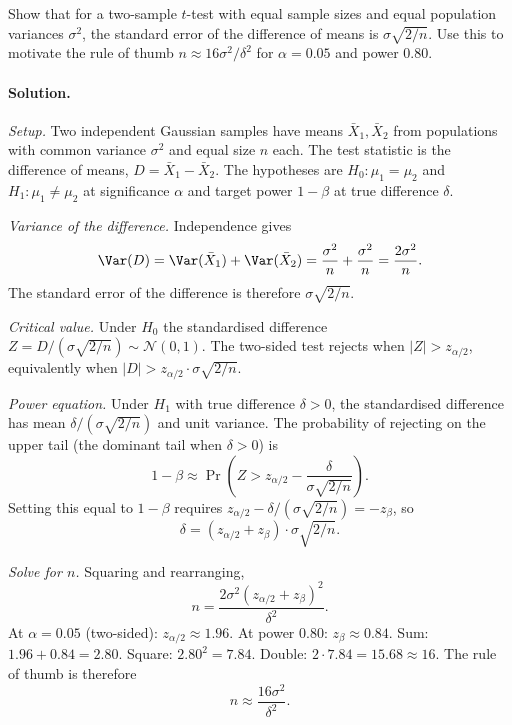 \begin{exercise}
Show that for a two-sample $t$-test with equal sample sizes and
equal population variances $\sigma^{2}$, the standard error of the
difference of means is $\sigma\sqrt{2/n}$. Use this to motivate
the rule of thumb $n \approx 16 \sigma^{2}/\delta^{2}$ for $\alpha
= 0.05$ and power $0.80$.
\end{exercise}

\paragraph{Solution.}
\textit{Setup.} Two independent Gaussian samples have means
$\bar{X}_{1}, \bar{X}_{2}$ from populations with common variance
$\sigma^{2}$ and equal size $n$ each. The test statistic is the
difference of means, $D = \bar{X}_{1} - \bar{X}_{2}$. The
hypotheses are $H_{0}: \mu_{1} = \mu_{2}$ and
$H_{1}: \mu_{1} \neq \mu_{2}$ at significance $\alpha$ and target
power $1 - \beta$ at true difference $\delta$.

\textit{Variance of the difference.} Independence gives
\[
\Var(D) = \Var(\bar{X}_{1}) + \Var(\bar{X}_{2})
= \frac{\sigma^{2}}{n} + \frac{\sigma^{2}}{n}
= \frac{2 \sigma^{2}}{n}.
\]
The standard error of the difference is therefore
$\sigma \sqrt{2/n}$.

\textit{Critical value.} Under $H_{0}$ the standardised difference
$Z = D/(\sigma \sqrt{2/n}) \sim \mathcal{N}(0, 1)$. The two-sided
test rejects when $|Z| > z_{\alpha/2}$, equivalently when
$|D| > z_{\alpha/2} \cdot \sigma \sqrt{2/n}$.

\textit{Power equation.} Under $H_{1}$ with true difference
$\delta > 0$, the standardised difference has mean
$\delta/(\sigma \sqrt{2/n})$ and unit variance. The probability of
rejecting on the upper tail (the dominant tail when $\delta > 0$)
is
\[
1 - \beta \approx \Pr\!\left(Z > z_{\alpha/2} - \frac{\delta}
{\sigma \sqrt{2/n}}\right).
\]
Setting this equal to $1 - \beta$ requires
$z_{\alpha/2} - \delta/(\sigma\sqrt{2/n}) = -z_{\beta}$, so
\[
\delta = (z_{\alpha/2} + z_{\beta}) \cdot \sigma \sqrt{2/n}.
\]

\textit{Solve for $n$.} Squaring and rearranging,
\[
n = \frac{2 \sigma^{2} (z_{\alpha/2} + z_{\beta})^{2}}{\delta^{2}}.
\]
At $\alpha = 0.05$ (two-sided): $z_{\alpha/2} \approx 1.96$. At
power $0.80$: $z_{\beta} \approx 0.84$. Sum: $1.96 + 0.84 = 2.80$.
Square: $2.80^{2} = 7.84$. Double: $2 \cdot 7.84 = 15.68 \approx 16$.
The rule of thumb is therefore
\[
n \approx \frac{16 \sigma^{2}}{\delta^{2}}.
\]

